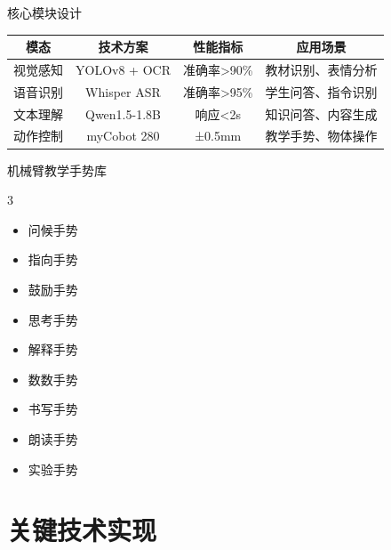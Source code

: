 \documentclass[aspectratio=169,12pt]{beamer}
\begin{document}
\begin{frame}{核心模块设计}
    \begin{table}[h]
        \centering
        \footnotesize
        \begin{tabular}{|c|c|c|c|}
        \hline
        \textbf{模态} & \textbf{技术方案} & \textbf{性能指标} & \textbf{应用场景} \\
        \hline
        视觉感知 & YOLOv8 + OCR & 准确率>90\% & 教材识别、表情分析 \\
        \hline
        语音识别 & Whisper ASR & 准确率>95\% & 学生问答、指令识别 \\
        \hline
        文本理解 & Qwen1.5-1.8B & 响应<2s & 知识问答、内容生成 \\
        \hline
        动作控制 & myCobot 280 & ±0.5mm & 教学手势、物体操作 \\
        \hline
        \end{tabular}
    \end{table}
    
    \vspace{1em}
    
    \begin{block}{机械臂教学手势库}
        \begin{multicols}{3}
            \footnotesize
            \begin{itemize}
                \item 问候手势
                \item 指向手势  
                \item 鼓励手势
                \item 思考手势
                \item 解释手势
                \item 数数手势
                \item 书写手势
                \item 朗读手势
                \item 实验手势
            \end{itemize}
        \end{multicols}
    \end{block}
\end{frame}

\section{关键技术实现}
\end{document}

